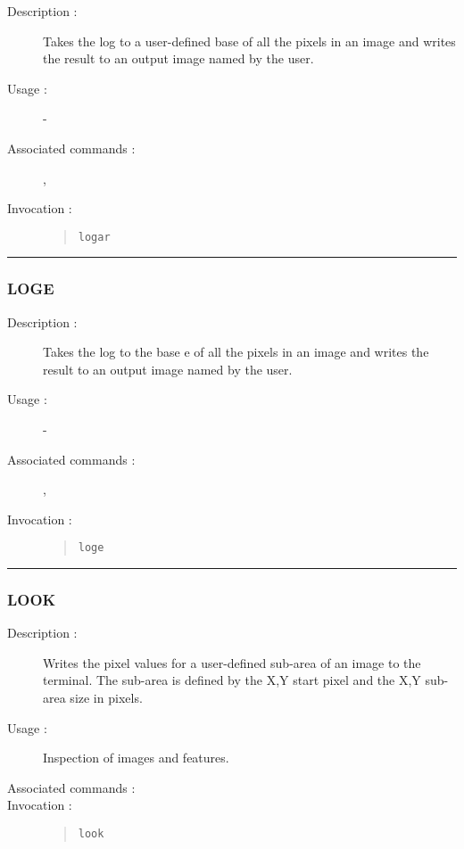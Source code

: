 \begin{description}

\item[Description :] Takes the log to a user-defined base of all the
pixels in an image and writes the result to an output image named by
the user.

\item[Usage :] -
\item[Associated commands :] {\tt {}},
{\tt {}}
\item[Invocation :]

\begin{quote}{\tt  logar }\end{quote}

\end{description}

\hrule
\subsubsection*{\label{LOGE}LOGE}

\begin{description}

\item[Description :] Takes the log to the base e of all the pixels in
an image and writes the result to an output image named by the user.

\item[Usage :] -
\item[Associated commands :] {\tt {}},
{\tt {}}
\item[Invocation :]

\begin{quote}{\tt  loge }\end{quote}

\end{description}

\hrule
\subsubsection*{\label{LOOK}LOOK}

\begin{description}

\item[Description :] Writes the pixel values for a user-defined
sub-area of an image to the terminal. The sub-area is defined by the
X,Y start pixel and the X,Y sub-area size in pixels.

\item[Usage :] Inspection of images and features.
\item[Associated commands :] {\tt {}}
\item[Invocation :]

\begin{quote}{\tt  look }\end{quote}

\end{description}

